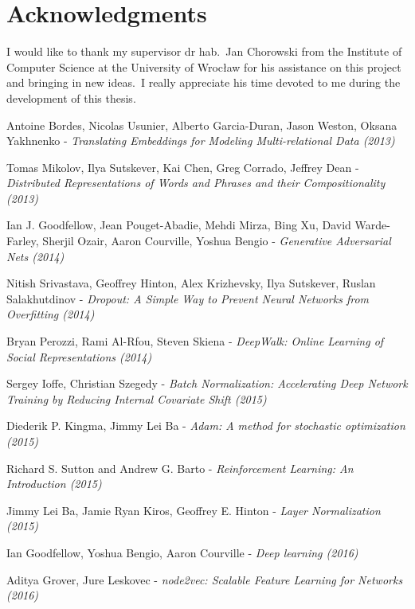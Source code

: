 \documentclass[longabstract, english, mgr]{iithesis}
\theoremstyle{default_theorem_style}\newtheorem{theorem}{Theorem}
\theoremstyle{default_theorem_style}\newtheorem{definition}{Definition}
\begin{document}
\section{Acknowledgments}

I would like to thank my supervisor dr hab.\ Jan Chorowski from the Institute of Computer Science at the
University of Wrocław for his assistance on this project and bringing in new ideas.\ I really appreciate his time
devoted to me during the development of this thesis.

\begin{thebibliography}{99}

Antoine Bordes, Nicolas Usunier, Alberto Garcia-Duran, Jason Weston, Oksana Yakhnenko - \textit{Translating Embeddings
for Modeling Multi-relational Data (2013)}

Tomas Mikolov, Ilya Sutskever, Kai Chen, Greg Corrado, Jeffrey Dean - \textit{Distributed Representations of
Words and Phrases and their Compositionality (2013)}

Ian J. Goodfellow, Jean Pouget-Abadie, Mehdi Mirza, Bing Xu, David Warde-Farley, Sherjil Ozair, Aaron Courville,
Yoshua Bengio - \textit{Generative Adversarial Nets (2014)}

Nitish Srivastava, Geoffrey Hinton, Alex Krizhevsky, Ilya Sutskever, Ruslan Salakhutdinov - \textit{Dropout: A
Simple Way to Prevent Neural Networks from Overfitting (2014)}

Bryan Perozzi, Rami Al-Rfou, Steven Skiena - \textit{DeepWalk: Online Learning of Social Representations (2014)}

Sergey Ioffe, Christian Szegedy - \textit{Batch Normalization: Accelerating Deep Network Training by
Reducing Internal Covariate Shift (2015)}

Diederik P. Kingma, Jimmy Lei Ba - \textit{Adam: A method for stochastic optimization (2015)}

Richard S. Sutton and Andrew G. Barto - \textit{Reinforcement Learning: An Introduction (2015)}

Jimmy Lei Ba, Jamie Ryan Kiros, Geoffrey E. Hinton - \textit{Layer Normalization (2015)}

Ian Goodfellow, Yoshua Bengio, Aaron Courville - \textit{Deep learning (2016)}

Aditya Grover, Jure Leskovec - \textit{node2vec: Scalable Feature Learning for Networks (2016)}


\end{thebibliography}
\end{document}
